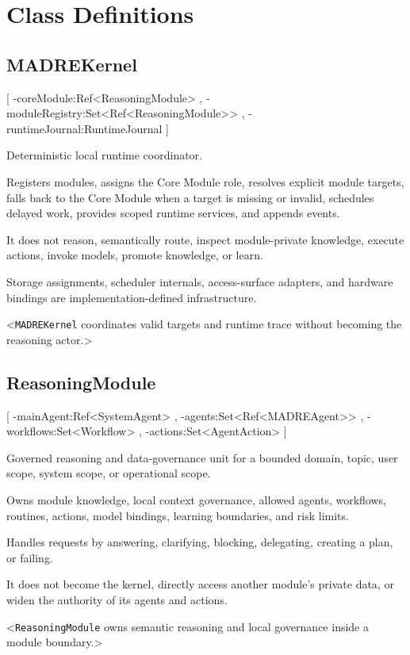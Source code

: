 \section{Class Definitions}

\subsection{MADREKernel}
[
	\UMLAt-coreModule:Ref<ReasoningModule> ,
	\UMLAt-moduleRegistry:Set<Ref<ReasoningModule>> ,
	\UMLAt-runtimeJournal:RuntimeJournal
]{%
	\item[] Deterministic local runtime coordinator.
	\item[] Registers modules, assigns the Core Module role, resolves explicit module targets, falls back to the Core Module when a target is missing or invalid, schedules delayed work, provides scoped runtime services, and appends events.
	\item[] It does not reason, semantically route, inspect module-private knowledge, execute actions, invoke models, promote knowledge, or learn.
	\item[] Storage assignments, scheduler internals, access-surface adapters, and hardware bindings are implementation-defined infrastructure.
}<\texttt{MADREKernel} coordinates valid targets and runtime trace without becoming the reasoning actor.>

\subsection{ReasoningModule}
[
	\UMLAt-mainAgent:Ref<SystemAgent> ,
	\UMLAt-agents:Set<Ref<MADREAgent>> ,
	\UMLAt-workflows:Set<Workflow> ,
	\UMLAt-actions:Set<AgentAction>
]{%
	\item[] Governed reasoning and data-governance unit for a bounded domain, topic, user scope, system scope, or operational scope.
	\item[] Owns module knowledge, local context governance, allowed agents, workflows, routines, actions, model bindings, learning boundaries, and risk limits.
	\item[] Handles requests by answering, clarifying, blocking, delegating, creating a plan, or failing.
	\item[] It does not become the kernel, directly access another module's private data, or widen the authority of its agents and actions.
}<\texttt{ReasoningModule} owns semantic reasoning and local governance inside a module boundary.>


